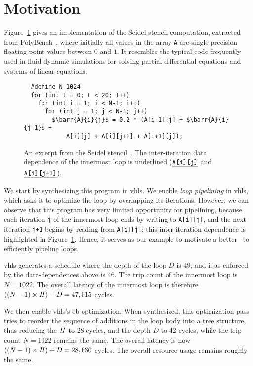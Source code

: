 \section{Motivation}
\label{lo:sec:motivation}

\newcommand\barr[3]{\texttt{\underline{#1[#2][#3]}}}

Figure~\ref{lo:fig:seidel_prog} gives an implementation of the Seidel stencil
computation, extracted from PolyBench~\cite{polybench}, where initially all
values in the array \verb|A| are single-precision floating-point values between
$0$ and $1$.  It resembles the typical code frequently used in fluid dynamic
simulations for solving partial differential equations and systems of linear
equations.

\begin{figure}[ht]
\begin{lstlisting}
  #define N 1024
  for (int t = 0; t < 20; t++)
    for (int i = 1; i < N-1; i++)
      for (int j = 1; j < N-1; j++)
        $\barr{A}{i}{j}$ = 0.2 * (A[i-1][j] + $\barr{A}{i}{j-1}$ +
            A[i][j] + A[i][j+1] + A[i+1][j]);
\end{lstlisting}
    \caption{%
        An excerpt from the Seidel stencil~\cite{polybench}.  The
        inter-iteration data dependence of the innermost loop is underlined
        ($\barr{A}{i}{j}$ and $\barr{A}{i}{j-1}$).
    }\label{lo:fig:seidel_prog}
\end{figure}

We start by synthesizing this program in \gls{vhls}\@.  We enable \emph{loop
pipelining} in \gls{vhls}, which asks it to optimize the loop by overlapping
its iterations.  However, we can observe that this program has very limited
opportunity for pipelining, because each iteration \verb|j| of the innermost
loop ends by writing to \verb|A[i][j]|, and the next iteration \verb|j+1|
begins by reading from \verb|A[i][j]|; this inter-iteration dependence is
highlighted in Figure~\ref{lo:fig:seidel_prog}.  Hence, it serves as our
example to motivate a better \soap~to efficiently pipeline loops.

\Gls{vhls} generates a schedule where the depth of the loop $D$ is $49$, and
\gls{ii} as enforced by the data-dependences above is $46$.  The trip count of
the innermost loop is $N = 1022$.  The overall latency of the innermost loop is
therefore $((N-1) \times \mathit{II}) + D = 47,015$ cycles.

We then enable \gls{vhls}'s \gls{eb} optimization.  When synthesized, this
optimization pass tries to reorder the sequence of additions in the loop body
into a tree structure, thus reducing the $\mathit{II}$ to 28 cycles, and the depth $D$
to 42 cycles, while the trip count $N = 1022$ remains the same.  The overall
latency is now $((N-1) \times \mathit{II}) + D = 28,630$ cycles.  The overall resource
usage remains roughly the same.


